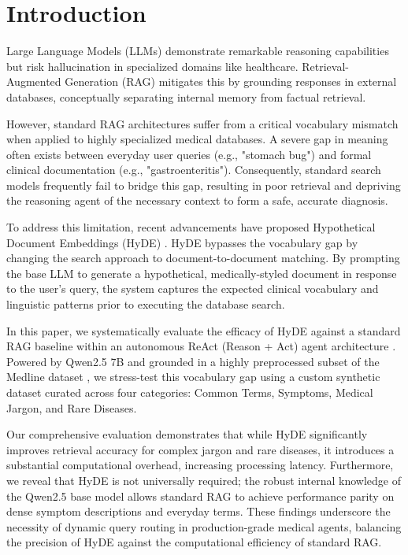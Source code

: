 \section{Introduction}
\label{sec:introduction}

Large Language Models (LLMs) demonstrate remarkable reasoning capabilities but risk hallucination in specialized domains like healthcare. Retrieval-Augmented Generation (RAG) mitigates this by grounding responses in external databases, conceptually separating internal memory from factual retrieval.

However, standard RAG architectures suffer from a critical vocabulary mismatch when applied to highly specialized medical databases. A severe gap in meaning often exists between everyday user queries (e.g., "stomach bug") and formal clinical documentation (e.g., "gastroenteritis"). Consequently, standard search models frequently fail to bridge this gap, resulting in poor retrieval and depriving the reasoning agent of the necessary context to form a safe, accurate diagnosis.

To address this limitation, recent advancements have proposed Hypothetical Document Embeddings (HyDE) \citep{gao2022hyde}. HyDE bypasses the vocabulary gap by changing the search approach to document-to-document matching. By prompting the base LLM to generate a hypothetical, medically-styled document in response to the user's query, the system captures the expected clinical vocabulary and linguistic patterns prior to executing the database search. 

In this paper, we systematically evaluate the efficacy of HyDE against a standard RAG baseline within an autonomous ReAct (Reason + Act) agent architecture \cite{yao2023react}. Powered by Qwen2.5 7B and grounded in a highly preprocessed subset of the Medline dataset \cite{medlineplus}, we stress-test this vocabulary gap using a custom synthetic dataset curated across four categories: Common Terms, Symptoms, Medical Jargon, and Rare Diseases.

Our comprehensive evaluation demonstrates that while HyDE significantly improves retrieval accuracy for complex jargon and rare diseases, it introduces a substantial computational overhead, increasing processing latency. Furthermore, we reveal that HyDE is not universally required; the robust internal knowledge of the Qwen2.5 base model allows standard RAG to achieve performance parity on dense symptom descriptions and everyday terms. These findings underscore the necessity of dynamic query routing in production-grade medical agents, balancing the precision of HyDE against the computational efficiency of standard RAG.
